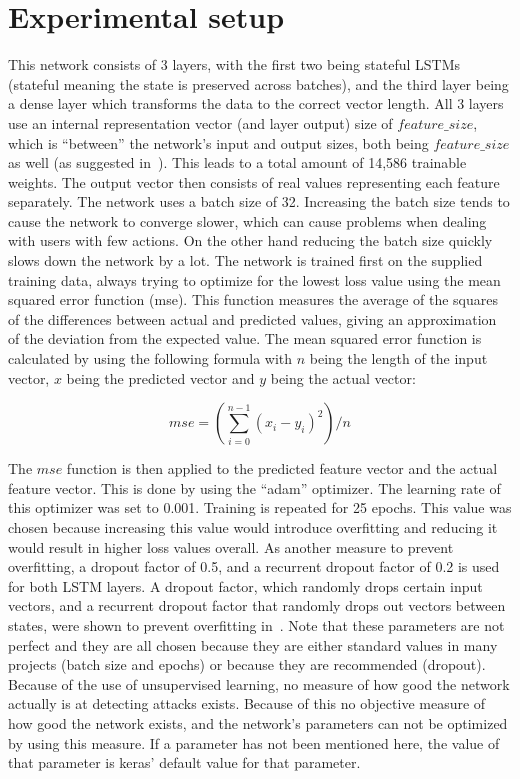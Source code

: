 \section{Experimental setup}
This network consists of 3 layers, with the first two being stateful LSTMs (stateful meaning the state is preserved across batches), and the third layer being a dense layer which transforms the data to the correct vector length. All 3 layers use an internal representation vector (and layer output) size of \(feature\_size \), which is \enquote{between} the network's input and output sizes, both being \(feature\_size \) as well (as suggested in~\cite{heaton2008introduction}). This leads to a total amount of 14,586 trainable weights. The output vector then consists of real values representing each feature separately. The network uses a batch size of 32. Increasing the batch size tends to cause the network to converge slower, which can cause problems when dealing with users with few actions. On the other hand reducing the batch size quickly slows down the network by a lot. The network is trained first on the supplied training data, always trying to optimize for the lowest loss value using the mean squared error function (mse). This function measures the average of the squares of the differences between actual and predicted values, giving an approximation of the deviation from the expected value. The mean squared error function is calculated by using the following formula with \(n\) being the length of the input vector, \(x\) being the predicted vector and \(y\) being the actual vector:

\begin{equation} \label{eq:mse}
mse = (\sum\limits_{i=0}^{n - 1} {(x_i - y_i)}^2) / n
\end{equation}

The \(mse\) function is then applied to the predicted feature vector and the actual feature vector. This is done by using the \enquote{adam} optimizer. The learning rate of this optimizer was set to 0.001. Training is repeated for 25 epochs. This value was chosen because increasing this value would introduce overfitting and reducing it would result in higher loss values overall. As another measure to prevent overfitting, a dropout factor of 0.5, and a recurrent dropout factor of 0.2 is used for both LSTM layers. A dropout factor, which randomly drops certain input vectors, and a recurrent dropout factor that randomly drops out vectors between states, were shown to prevent overfitting in~\cite{srivastava2014dropout}. Note that these parameters are not perfect and they are all chosen because they are either standard values in many projects (batch size and epochs) or because they are recommended (dropout). Because of the use of unsupervised learning, no measure of how good the network actually is at detecting attacks exists. Because of this no objective measure of how good the network exists, and the network's parameters can not be optimized by using this measure. If a parameter has not been mentioned here, the value of that parameter is keras' default value for that parameter.

